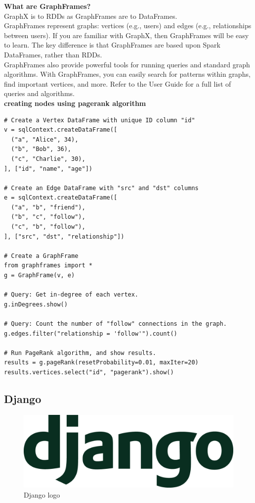 {\bf What are GraphFrames?}\\
GraphX is to RDDs as GraphFrames are to DataFrames.\\

GraphFrames represent graphs: vertices (e.g., users) and edges (e.g., relationships between users). If you are familiar with GraphX, then GraphFrames will be easy to learn. The key difference is that GraphFrames are based upon Spark DataFrames, rather than RDDs.\\

GraphFrames also provide powerful tools for running queries and standard graph algorithms. With GraphFrames, you can easily search for patterns within graphs, find important vertices, and more. Refer to the User Guide for a full list of queries and algorithms.\\


{\bf creating nodes using pagerank algorithm}
\begin{verbatim}
# Create a Vertex DataFrame with unique ID column "id"
v = sqlContext.createDataFrame([
  ("a", "Alice", 34),
  ("b", "Bob", 36),
  ("c", "Charlie", 30),
], ["id", "name", "age"])

# Create an Edge DataFrame with "src" and "dst" columns
e = sqlContext.createDataFrame([
  ("a", "b", "friend"),
  ("b", "c", "follow"),
  ("c", "b", "follow"),
], ["src", "dst", "relationship"])

# Create a GraphFrame
from graphframes import *
g = GraphFrame(v, e)

# Query: Get in-degree of each vertex.
g.inDegrees.show()

# Query: Count the number of "follow" connections in the graph.
g.edges.filter("relationship = 'follow'").count()

# Run PageRank algorithm, and show results.
results = g.pageRank(resetProbability=0.01, maxIter=20)
results.vertices.select("id", "pagerank").show()
\end{verbatim}

\subsection{Django}
\begin{figure}[h]
	\centering \includegraphics[scale=0.2]{input/images/django.png}
	\caption{Django logo}
\end{figure}
